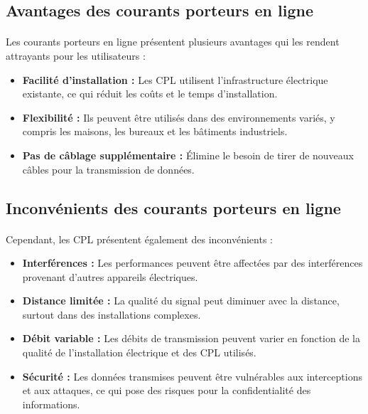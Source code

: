 \documentclass[a4paper,twocolumn]{report}
\begin{document}
\subsection{Avantages des courants porteurs en ligne}
\paragraph{} Les courants porteurs en ligne présentent plusieurs avantages qui les rendent attrayants pour les utilisateurs :
\begin{itemize}
	\item \textbf{Facilité d'installation :} Les CPL utilisent l'infrastructure
    électrique existante, ce qui réduit les coûts et le temps d'installation.
	\item \textbf{Flexibilité :} Ils peuvent être utilisés dans des environnements variés,
    y compris les maisons, les bureaux et les bâtiments industriels.
	\item \textbf{Pas de câblage supplémentaire :} Élimine le besoin de tirer de
    nouveaux câbles pour la transmission de données.
\end{itemize}

\subsection{Inconvénients des courants porteurs en ligne}
\paragraph{} Cependant, les CPL présentent également des inconvénients :
\begin{itemize}
	\item \textbf{Interférences :} Les performances peuvent être affectées par des
    interférences provenant d'autres appareils électriques.
	\item \textbf{Distance limitée :} La qualité du signal peut diminuer avec la distance,
    surtout dans des installations complexes.
	\item \textbf{Débit variable :} Les débits de transmission peuvent varier en fonction
    de la qualité de l'installation électrique et des CPL utilisés.
	\item \textbf{Sécurité :} Les données transmises peuvent être vulnérables aux interceptions et aux attaques, ce qui pose des risques pour la confidentialité des informations.
\end{itemize}
\end{document}
